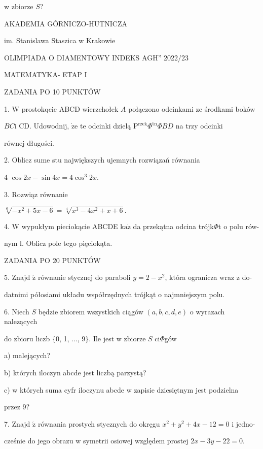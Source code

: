 \documentclass[a4paper,12pt]{article}
\begin{document}
w zbiorze $S$?






AKADEMIA GÓRNICZO-HUTNICZA

im. Stanislawa Staszica w Krakowie

OLIMPIADA O DIAMENTOWY INDEKS AGH'' 2022/23

MATEMATYKA- ETAP I

ZADANIA PO 10 PUNKTÓW

1. $\mathrm{W}$ prostokqcie ABCD wierzchołek $A$ połączono odcinkami ze środkami boków

$BC \mathrm{i}$ CD. Udowodnij, $\dot{\mathrm{z}}\mathrm{e}$ te odcinki dzielą $\mathrm{P}^{\mathrm{r}\mathrm{z}\mathrm{e}\mathrm{k}}\Phi^{\mathrm{t}\mathrm{n}}\Phi BD$ na trzy odcinki

równej długości.

2. Oblicz sume stu największych ujemnych rozwiązań równania

4 $\cos 2x-\sin 4x=4\cos^{3}2x.$

3. Rozwiąz równanie

$\sqrt[6]{-x^{2}+5x-6}=\sqrt[4]{x^{3}-4x^{2}+x+6}.$

4. $\mathrm{W}$ wypukłym pieciokącie ABCDE $\mathrm{k}\mathrm{a}\dot{\mathrm{z}}$ da przekątna odcina trójk$\Phi$t o polu rów-

nym l. Oblicz pole tego pięciokąta.

ZADANIA PO 20 PUNKTÓW

5. Znajd $\acute{\mathrm{z}}$ równanie stycznej do paraboli $y=2-x^{2}$, która ogranicza wraz z do-

datnimi półosiami układu współrzędnych trójkąt o najmniejszym polu.

6. Niech $S$ będzie zbiorem wszystkich ciągów $(a,b,c,d,e)$ o wyrazach nalezących

do zbioru liczb $\{0$, 1, $\ldots$, 9$\}$. Ile jest w zbiorze $S$ ci$\Phi$gów

a) malejących?

b) których iloczyn abcde jest liczbą parzystą?

c) w których suma cyfr iloczynu abcde w zapisie dziesiętnym jest podzielna

przez 9?

7. Znajd $\acute{\mathrm{z}}$ równania prostych stycznych do okręgu $x^{2}+y^{2}+4x-12=0$ i jedno-

cześnie do jego obrazu w symetrii osiowej względem prostej $2x-3y-22=0.$
\end{document}
